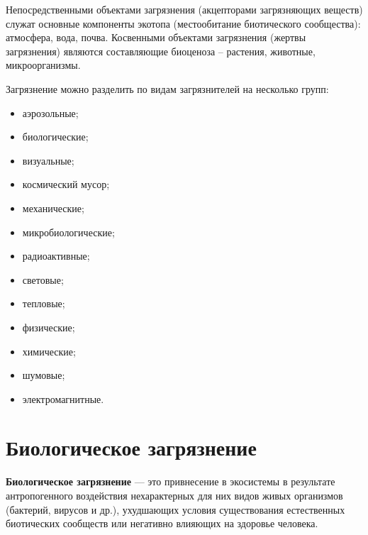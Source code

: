 \documentclass[a4paper, 12pt]{extarticle}
\begin{document}
Непосредственными объектами загрязнения (акцепторами загрязняющих веществ) служат основные компоненты экотопа (местообитание биотического сообщества): атмосфера, вода, почва. Косвенными объектами загрязнения (жертвы загрязнения) являются составляющие биоценоза – растения, животные, микроорганизмы.

Загрязнение можно разделить по видам загрязнителей на несколько групп:
\begin{itemize}
    \item аэрозольные;
    \item биологические;
    \item визуальные;
    \item космический мусор;
    \item механические;
    \item микробиологические;
    \item радиоактивные;
    \item световые;
    \item тепловые;
    \item физические;
    \item химические;
    \item шумовые;
    \item электромагнитные.
\end{itemize}

\section{Биологическое загрязнение}

\textbf{Биологическое загрязнение} --- это привнесение в экосистемы в результате антропогенного воздействия нехарактерных для них видов живых организмов (бактерий, вирусов и др.), ухудшающих условия существования естественных биотических сообществ или негативно влияющих на здоровье человека.
\end{document}
